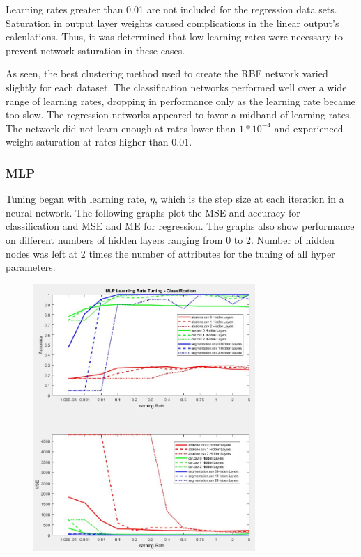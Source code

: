\documentclass[twoside,11pt]{article}
\begin{document}
Learning rates greater than 0.01 are not included for the regression data sets. Saturation in output layer weights caused complications in the linear output's calculations. Thus, it was determined that low learning rates were necessary to prevent network saturation in these cases.

As seen, the best clustering method used to create the RBF network varied slightly for each dataset. The classification networks performed well over a wide range of learning rates, dropping in performance only as the learning rate became too slow. The regression networks appeared to favor a midband of learning rates. The network did not learn enough at rates lower than $1*10^{-4}$ and experienced weight saturation at rates higher than $0.01$.


\subsubsection{MLP}
Tuning began with learning rate, $\eta$, which is the step size at each iteration in a neural network. The following graphs plot the MSE and accuracy for classification and MSE and ME for regression. The graphs also show performance on different numbers of hidden layers ranging from 0 to 2. Number of hidden nodes was left at 2 times the number of attributes for the tuning of all hyper parameters.
\begin{figure}[h]
	\centering
	\includegraphics[height=4in]{FINAL_FIGS/MLP_LR_TUNING_CLASS.JPG}
\end{figure}
\end{document}
